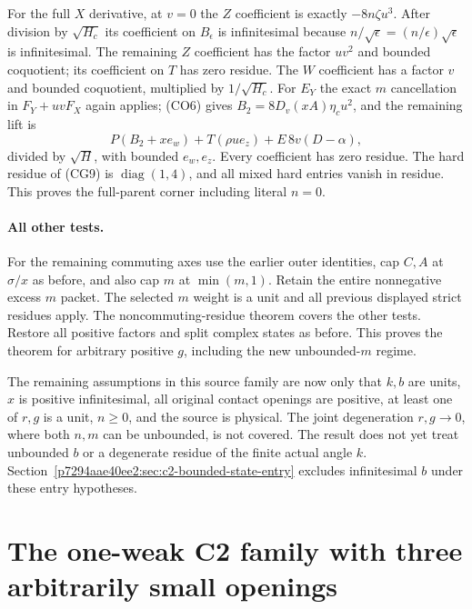 For the full $X$ derivative, at $v=0$ the $Z$ coefficient is exactly
$-8n\zeta u^3$.  After division by $\sqrt{H_c}$ its coefficient
on $B_\epsilon$ is infinitesimal because
$n/\sqrt\epsilon=(n/\epsilon)\sqrt\epsilon$ is infinitesimal.
The remaining $Z$ coefficient has the factor $uv^2$ and bounded
coquotient; its coefficient on $T$ has zero residue.  The $W$
coefficient has a factor $v$ and bounded coquotient, multiplied by
$1/\sqrt{H_c}$.  For $E_Y$ the exact $m$ cancellation in
$F_Y+uvF_X$ again applies; (CO6) gives
$B_2=8D_v(xA)\eta_c u^2$, and the remaining lift is
\[
 P(B_2+xe_w)+T(\rho u e_z)+E\,8v(D-\alpha),
\]
divided by $\sqrt H$, with bounded $e_w,e_z$.
Every coefficient has zero residue.  The hard residue of (CG9) is
$\operatorname{diag}(1,4)$, and all mixed hard entries vanish in
residue.  This proves the full-parent corner including literal $n=0$.

\paragraph{All other tests.}
For the remaining commuting axes use the earlier outer identities,
cap $C,A$ at $\sigma/x$ as before, and also cap $m$ at
$\min(m,1)$.  Retain the entire nonnegative excess $m$ packet.
The selected $m$ weight is a unit and all previous displayed
strict residues apply.  The noncommuting-residue theorem covers
the other tests.  Restore all positive factors and split complex
states as before.  This proves the theorem for arbitrary positive
$g$, including the new unbounded-$m$ regime.

The remaining assumptions in this source family are now only that
$k,b$ are units, $x$ is positive infinitesimal, all original contact
openings are positive, at least one of $r,g$ is a unit, $n\geq0$,
and the source is physical.  The joint degeneration $r,g\to0$,
where both $n,m$ can be unbounded, is not covered.  The
result does not yet treat unbounded $b$ or a degenerate residue of
the finite actual angle $k$.  Section~\ref{p7294aae40ee2:sec:c2-bounded-state-entry}
excludes infinitesimal $b$ under these entry hypotheses.


\section{\texorpdfstring{The one-weak C2 family with three arbitrarily small openings}{The one-weak C2 family with three arbitrarily small openings}}
\label{component:p81893ad08bed}

\label{p81893ad08bed:sec:c2-three-openings}

